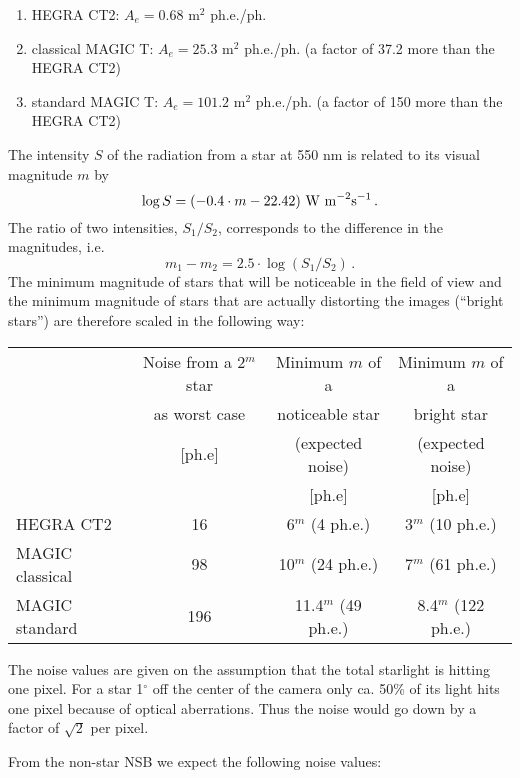 \begin{enumerate}
\item  HEGRA CT2: $A_{e}=0.68$ m$^{2}$ ph.e./ph.

\item  classical MAGIC T: $A_{e}=25.3$ m$^{2}$ ph.e./ph.\newline
(a factor of 37.2 more than the HEGRA CT2)

\item  standard MAGIC T: $A_{e}=101.2$ m$^{2}$ ph.e./ph.\newline
(a factor of 150 more than the HEGRA CT2)
\end{enumerate}

The intensity $S$ of the radiation from a star at 550 nm is related to its
visual magnitude $m$ by 
\[
\log S = (-0.4 \cdot m -22.42)\ {\rm W~m}^{-2}{\rm s}^{-1}\, . 
\]
The ratio of two intensities, $S_1/S_2$, corresponds to the difference in
the magnitudes, i.e. 
\[
m_1 - m_2 = 2.5 \cdot \log (S_1 /S_2 )\, . 
\]
The minimum magnitude of stars that will be noticeable in the field of view
and the minimum magnitude of stars that are actually distorting the images
(``bright stars'') are therefore scaled in the following way:

\begin{center}
\begin{tabular}{|l|c|c|c|}
\hline
& Noise from a 2$^{m}$ star & Minimum $m$ of a & Minimum $m$ of a \\ 
& as worst case & noticeable star & bright star \\ 
& [ph.e] & (expected noise) & (expected noise) \\ 
&  & [ph.e] & [ph.e] \\ \hline\hline
HEGRA CT2 & 16 & 6$^{m}$ (4 ph.e.) & 3$^{m}$ (10 ph.e.) \\ \hline
MAGIC classical & 98 & 10$^{m}$ (24 ph.e.) & 7$^{m}$ (61 ph.e.) \\ \hline
MAGIC standard & 196 & 11.4$^{m}$ (49 ph.e.) & 8.4$^{m}$ (122 ph.e.) \\ 
\hline
\end{tabular}
\end{center}

The noise values are given on the assumption that the total starlight is
hitting one pixel. For a star 1$^\circ$ off the center of the camera only
ca. 50\% of its light hits one pixel because of optical aberrations. Thus
the noise would go down by a factor of $\sqrt{2}$ per pixel.

From the non-star NSB we expect the following noise values:

